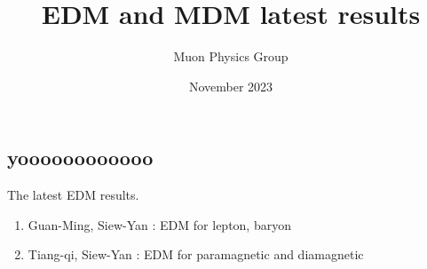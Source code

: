 \documentclass[12pt]{article}
\title{EDM and MDM latest results}
\author{Muon Physics Group}
\date{November 2023}
\begin{document}
\begin{landscape}

\section{yoooooooooooo}

\noindent The latest EDM results.
\begin{enumerate}
\item Guan-Ming, Siew-Yan : EDM for lepton, baryon
\item Tiang-qi, Siew-Yan  : EDM for paramagnetic and diamagnetic
\end{enumerate}


\end{landscape}
\end{document}
